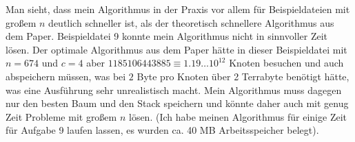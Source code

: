 \documentclass[a4paper,10pt,ngerman]{scrartcl}
\begin{document}
    Man sieht, dass mein Algorithmus in der Praxis vor allem für Beispieldateien mit großem $n$ deutlich schneller ist, als der theoretisch schnellere Algorithmus aus dem Paper.
    Beispieldatei 9 konnte mein Algorithmus nicht in sinnvoller Zeit lösen.
    Der optimale Algorithmus aus dem Paper hätte in dieser Beispieldatei mit $n = 674$ und $c = 4$ aber $1185106443885 \equiv 1.19 \dots 10^{12}$ Knoten besuchen und auch abspeichern müssen, was bei $2$ Byte pro Knoten
    über 2 Terrabyte benötigt hätte, was eine Ausführung sehr unrealistisch macht.
    Mein Algorithmus muss dagegen nur den besten Baum und den Stack speichern und könnte daher auch mit genug Zeit Probleme mit großem $n$ lösen.
    (Ich habe meinen Algorithmus für einige Zeit für Aufgabe 9 laufen lassen, es wurden ca. 40 MB Arbeitsspeicher belegt).
\end{document}
